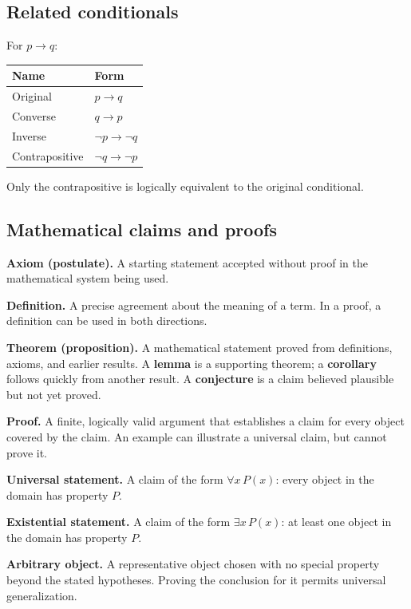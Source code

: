 \documentclass[10pt]{article}
\newcommand{\term}[1]{\textbf{\color{ProofNavy}#1}}
\begin{document}
\begin{multicols}{2}
\subsection*{Related conditionals}

For $p\to q$:
\begin{center}
\begin{tabularx}{\linewidth}{@{}lY@{}}
\toprule
\textbf{Name} & \textbf{Form} \\
\midrule
Original & $p\to q$ \\
Converse & $q\to p$ \\
Inverse & $\neg p\to\neg q$ \\
Contrapositive & $\neg q\to\neg p$ \\
\bottomrule
\end{tabularx}
\end{center}
Only the contrapositive is logically equivalent to the original conditional.

\columnbreak
\subsection*{Mathematical claims and proofs}

\term{Axiom (postulate).} A starting statement accepted without proof in the
mathematical system being used.

\term{Definition.} A precise agreement about the meaning of a term. In a
proof, a definition can be used in both directions.

\term{Theorem (proposition).} A mathematical statement proved from definitions,
axioms, and earlier results. A \term{lemma} is a supporting theorem; a
\term{corollary} follows quickly from another result. A \term{conjecture} is a
claim believed plausible but not yet proved.

\term{Proof.} A finite, logically valid argument that establishes a claim for
every object covered by the claim. An example can illustrate a universal claim,
but cannot prove it.

\term{Universal statement.} A claim of the form $\forall x\,P(x)$: every object
in the domain has property $P$.

\term{Existential statement.} A claim of the form $\exists x\,P(x)$: at least
one object in the domain has property $P$.

\term{Arbitrary object.} A representative object chosen with no special
property beyond the stated hypotheses. Proving the conclusion for it permits
universal generalization.


\end{multicols}
\end{document}

